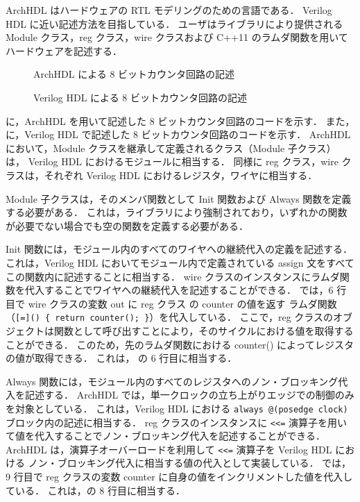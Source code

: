 ArchHDL はハードウェアの RTL モデリングのための言語である．
Verilog HDL に近い記述方法を目指している．
ユーザはライブラリにより提供される Module クラス，reg クラス，wire クラスおよび C++11 のラムダ関数を用いて
ハードウェアを記述する．

\begin{figure}[t]
 
 \caption{ArchHDL による 8 ビットカウンタ回路の記述}
 \label{src:counter}
\end{figure}

\begin{figure}[t]
 
 \caption{Verilog HDL による 8 ビットカウンタ回路の記述}
 \label{src:counter_v}
\end{figure}

に，ArchHDL を用いて記述した 8 ビットカウンタ回路のコードを示す．
また， に，Verilog HDL で記述した 8 ビットカウンタ回路のコードを示す．
ArchHDL において，Module クラスを継承して定義されるクラス（Module 子クラス）は，
Verilog HDL におけるモジュールに相当する．
同様に reg クラス，wire クラスは，それぞれ Verilog HDL におけるレジスタ，ワイヤに相当する．

Module 子クラスは，そのメンバ関数として Init 関数および Always 関数を定義する必要がある．
これは，ライブラリにより強制されており，いずれかの関数が必要でない場合でも空の関数を定義する必要がある．

Init 関数には，モジュール内のすべてのワイヤへの継続代入の定義を記述する．
これは，Verilog HDL においてモジュール内で定義されている assign 文をすべてこの関数内に記述することに相当する．
wire クラスのインスタンスにラムダ関数を代入することでワイヤへの継続代入を記述することができる．
では，6 行目で wire クラスの変数 out に reg クラス の counter の値を返す
ラムダ関数（\verb/[=]() { return counter(); }/）を代入している．
ここで，reg クラスのオブジェクトは関数として呼び出すことにより，そのサイクルにおける値を取得することができる．
このため，先のラムダ関数における counter() によってレジスタの値が取得できる．
これは， の 6 行目に相当する．

Always 関数には，モジュール内のすべてのレジスタへのノン・ブロッキング代入を記述する．
ArchHDL では，単一クロックの立ち上がりエッジでの制御のみを対象としている．
これは，Verilog HDL における \verb/always @(posedge clock)/ ブロック内の記述に相当する．
reg クラスのインスタンスに \verb/<<=/ 演算子を用いて値を代入することでノン・ブロッキング代入を記述することができる．
ArchHDL は，演算子オーバーロードを利用して \verb/<<=/ 演算子を Verilog HDL における
ノン・ブロッキング代入に相当する値の代入として実装している．
では，9 行目で reg クラスの変数 counter に自身の値をインクリメントした値を代入している．
これは，の 8 行目に相当する．

